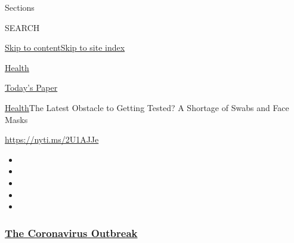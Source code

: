 Sections

SEARCH

\protect\hyperlink{site-content}{Skip to
content}\protect\hyperlink{site-index}{Skip to site index}

\href{https://www.nytimes3xbfgragh.onion/section/health}{Health}

\href{https://myaccount.nytimes3xbfgragh.onion/auth/login?response_type=cookie\&client_id=vi}{}

\href{https://www.nytimes3xbfgragh.onion/section/todayspaper}{Today's
Paper}

\href{/section/health}{Health}\textbar{}The Latest Obstacle to Getting
Tested? A Shortage of Swabs and Face Masks

\url{https://nyti.ms/2U1AJJe}

\begin{itemize}
\item
\item
\item
\item
\item
\end{itemize}

\hypertarget{the-coronavirus-outbreak}{%
\subsubsection{\texorpdfstring{\href{https://www.nytimes3xbfgragh.onion/news-event/coronavirus?name=styln-coronavirus-national\&region=TOP_BANNER\&block=storyline_menu_recirc\&action=click\&pgtype=Article\&impression_id=9cc9e110-f4b7-11ea-84c5-ff3c2ad4221c\&variant=undefined}{The
Coronavirus
Outbreak}}{The Coronavirus Outbreak}}\label{the-coronavirus-outbreak}}

